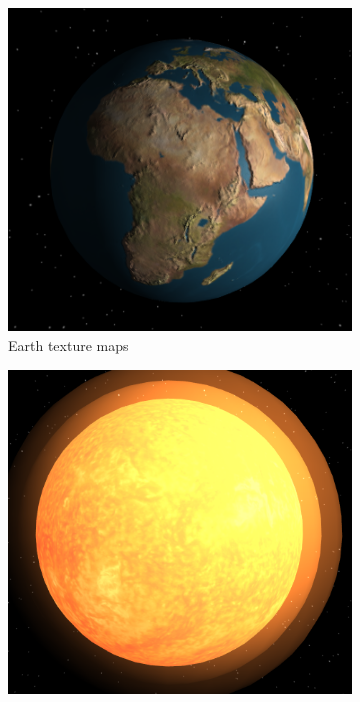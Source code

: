 \documentclass[12pt]{article}
\begin{document}
\begin{figure}[H]
        \centering
        \begin{subfigure}[b]{0.4\textwidth}
                \includegraphics[width=\textwidth]{images/earthtexture}
                \caption{Earth texture maps}
                \label{fig: The Earth texture mapped.}
       \end{subfigure}
                 \begin{subfigure}[b]{0.4\textwidth}
                \includegraphics[width=\textwidth]{images/suntexture}

\end{subfigure}
\end{figure}
\end{document}
